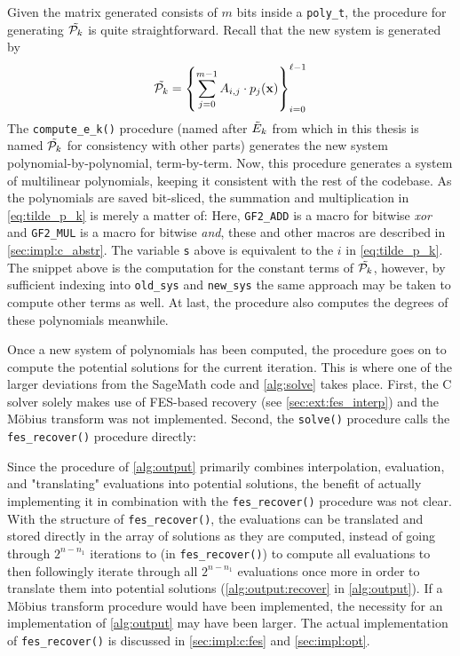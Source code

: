Given the matrix generated consists of $m$ bits inside a \texttt{poly\_t}, the procedure for generating $\Tilde{\mathcal{P}_k}$ is quite straightforward. Recall that the new system is generated by
\begin{equation} \label{eq:tilde_p_k}
    \Tilde{\mathcal{P}_k} = \left\{\sum_{j = 0}^{m - 1} A_{i,j} \cdot p_j(\mathbf{x})\right\}_{i=0}^{\ell - 1}
\end{equation}
The \texttt{compute\_e\_k()} procedure (named after $\Tilde{E}_k$ from \cite{eurocrypt-2021-30841} which in this thesis is named $\Tilde{\mathcal{P}_k}$ for consistency with other parts) generates the new system polynomial-by-polynomial, term-by-term. Now, this procedure generates a system of multilinear polynomials, keeping it consistent with the rest of the codebase. As the polynomials are saved bit-sliced, the summation and multiplication in \cref{eq:tilde_p_k} is merely a matter of:
Here, \texttt{GF2\_ADD} is a macro for bitwise \textit{xor} and \texttt{GF2\_MUL} is a macro for bitwise \textit{and}, these and other macros are described in \cref{sec:impl:c_abstr}. The variable \texttt{s} above is equivalent to the $i$ in \cref{eq:tilde_p_k}. The snippet above is the computation for the constant terms of $\Tilde{\mathcal{P}_k}$, however, by sufficient indexing into \texttt{old\_sys} and \texttt{new\_sys} the same approach may be taken to compute other terms as well. At last, the procedure also computes the degrees of these polynomials meanwhile.

Once a new system of polynomials has been computed, the procedure goes on to compute the potential solutions for the current iteration. This is where one of the larger deviations from the SageMath code and \cref{alg:solve} takes place. First, the C solver solely makes use of FES-based recovery (see \cref{sec:ext:fes_interp}) and the Möbius transform was not implemented. Second, the \texttt{solve()} procedure calls the \texttt{fes\_recover()} procedure directly:

Since the procedure of \cref{alg:output} primarily combines interpolation, evaluation, and "translating" evaluations into potential solutions, the benefit of actually implementing it in combination with the \texttt{fes\_recover()} procedure was not clear. With the structure of \texttt{fes\_recover()}, the evaluations can be translated and stored directly in the array of solutions as they are computed, instead of going through $2^{n - n_1}$ iterations to (in \texttt{fes\_recover()}) to compute all evaluations to then followingly iterate through all $2^{n - n_1}$ evaluations once more in order to translate them into potential solutions (\cref{alg:output:recover} in \cref{alg:output}). If a Möbius transform procedure would have been implemented, the necessity for an implementation of \cref{alg:output} may have been larger. The actual implementation of \texttt{fes\_recover()} is discussed in \cref{sec:impl:c:fes} and \cref{sec:impl:opt}.

